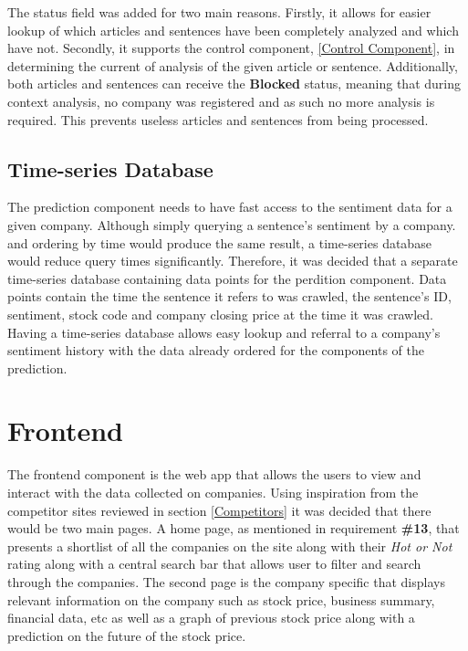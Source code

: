         The status field was added for two main reasons. Firstly, it allows for easier lookup of which articles and sentences have been completely analyzed and which have not. Secondly, it supports the control component, \ref{Control Component}, in determining the current of analysis of the given article or sentence. Additionally, both articles and sentences can receive the \textbf{Blocked} status, meaning that during context analysis, no company was registered and as such no more analysis is required. This prevents useless articles and sentences from being processed.  
        
        \subsection{Time-series Database}
        \label{TimeseriesDB}
        The prediction component needs to have fast access to the sentiment data for a given company. Although simply querying a sentence's sentiment by a company. and ordering by time would produce the same result, a time-series database would reduce query times significantly. Therefore, it was decided that a separate time-series database containing data points for the perdition component. Data points contain the time the sentence it refers to was crawled, the sentence's ID, sentiment, stock code and company closing price at the time it was crawled. Having a time-series database allows easy lookup and referral to a company's sentiment history with the data already ordered for the components of the prediction.  
       
       
    \section{Frontend}
    The frontend component is the web app that allows the users to view and interact with the data collected on companies. Using inspiration from the competitor sites reviewed in section \ref{Competitors} it was decided that there would be two main pages. A home page, as mentioned in requirement \textbf{\#13}, that presents a shortlist of all the companies on the site along with their \emph{Hot or Not} rating along with a central search bar that allows user to filter and search through the companies. The second page is the company specific that displays relevant information on the company such as stock price, business summary, financial data, etc as well as a graph of previous stock price along with a prediction on the future of the stock price. 
        
